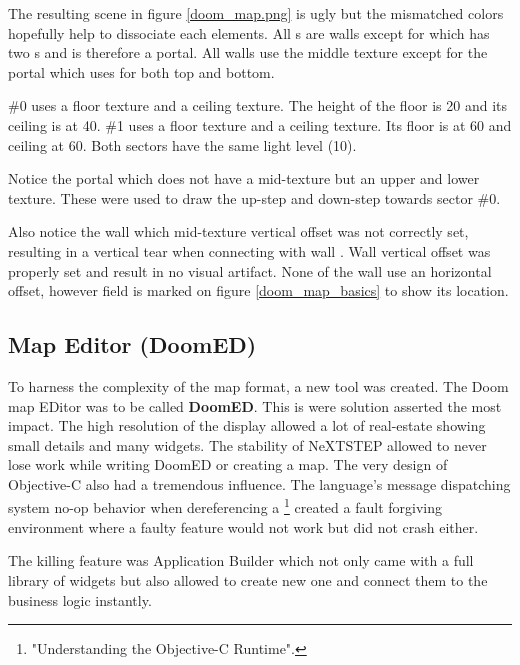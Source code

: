 \par
The resulting scene in figure \ref{doom_map.png} is ugly but the mismatched colors hopefully help to dissociate each elements. All s are walls except for  which has two s and is therefore a portal. All walls use the  middle texture except for the portal which uses  for both top and bottom.\\
\par
{} \#0 uses a  floor texture and a  ceiling texture. The height of the floor is 20 and its ceiling is at 40.  \#1 uses a  floor texture and a  ceiling texture. Its floor is at 60 and ceiling at 60. Both sectors have the same light level (10).\\
\par
   Notice the portal  which does not have a mid-texture but an upper and lower texture. These were used to draw the up-step and down-step towards sector \#0.\\
\par
Also notice the wall  which mid-texture vertical offset was not correctly set, resulting in a vertical tear when connecting with wall . Wall  vertical offset was properly set and result in no visual artifact. None of the wall use an horizontal offset, however field is marked  on figure \ref{doom_map_basics} to show its location.\\ 
\pagebreak



\subsection{Map Editor (DoomED)}
To harness the complexity of the map format, a new tool was created. The Doom map EDitor was to be called \textbf{DoomED}. This is were \NeXT solution asserted the most impact. The high resolution of the display allowed a lot of real-estate showing small details and many widgets. The stability of NeXTSTEP allowed to never lose work while writing DoomED or creating a map.
The very design of Objective-C also had a tremendous influence. The language's message dispatching system no-op behavior when dereferencing a \footnote{"Understanding the Objective-C Runtime".} created a fault forgiving environment where a faulty feature would not work but did not crash either.\\
\par   
The killing feature was Application Builder which not only came with a full library of widgets but also allowed to create new one and connect them to the business logic instantly.\\
\par
{}
\par


